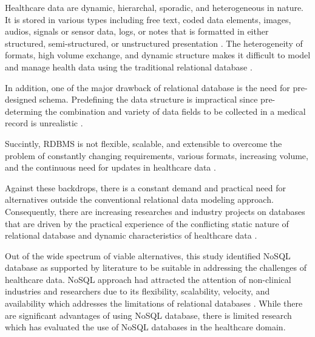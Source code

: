 \documentclass[5p]{elsarticle}
\begin{document}
Healthcare data are dynamic, hierarchal, sporadic, and heterogeneous in nature. 
It is stored in various types including free text, coded data elements, images, audios, signals or sensor data, logs, or notes that is formatted in either structured, semi-structured, 
or unstructured presentation \cite{M.Ercan190510,K.Lee201299,C.S.Kruse201638,S.White201413,S.Wasan1192016}.
The heterogeneity of formats, high volume exchange, and dynamic structure makes it difficult to model and manage health 
data using the traditional relational database \cite{K.Lee201299,H.Al-Fatlawi2015122,O.Schmitt20121,Y.Jin2011288}.

In addition, one of the major drawback of relational database is the need for pre-designed schema. 
Predefining the data structure is impractical since pre-determing the combination and variety of data fields to be collected in a medical record is unrealistic \cite{K.Lee201299}. 

Succintly, RDBMS is not flexible, scalable, and extensible to overcome the problem of constantly changing requirements, various formats, increasing volume, and the continuous need for updates in healthcare data \cite{Z.Goli-Malekabadi201675,K.Lee201299,H.Al-Fatlawi2015122,O.Schmitt20121,Y.Jin2011288}.

Against these backdrops, there is a constant demand and practical need for alternatives outside the conventional relational data modeling approach. 
Consequently, there are increasing researches and industry projects on databases that are driven by the practical experience of the conflicting static 
nature of relational database and dynamic characteristics of healthcare data \cite{M.Ercan190510}.

Out of the wide spectrum of viable alternatives, this study identified NoSQL database as supported by literature to be suitable in addressing the challenges of 
healthcare data. NoSQL approach had attracted the attention of non-clinical industries  and researchers due to its flexibility, scalability, velocity, and 
availability which addresses the limitations of relational databases \cite{M.Ercan190510,C.S.Kruse201638,Z.Parker20131,G.D.Ferreira2013125}.
While there are significant advantages of using NoSQL database, there is limited research which has evaluated the use of NoSQL databases in the healthcare domain.
\end{document}
